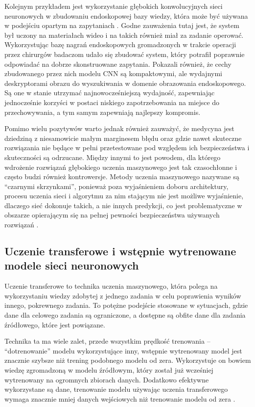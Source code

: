 Kolejnym przykładem jest wykorzystanie głębokich konwolucyjnych sieci neuronowych w zbudowaniu endoskopowej bazy wiedzy, która może być używana w podejściu opartym na zapytaniach \cite{petscharnig2018binary}.
Godne zauważenia tutaj jest, że system był uczony na materiałach wideo i na takich również miał za zadanie operować.
Wykorzystując bazę nagrań endoskopowych gromadzonych w trakcie operacji przez chirurgów badaczom udało się zbudować system, który potrafił poprawnie odpowiadać na dobrze skonstruowane zapytania.
Pokazali również, że cechy zbudowanego przez nich modelu CNN są kompaktowymi, ale wydajnymi deskryptorami obrazu do wyszukiwania w domenie obrazowania endoskopowego.
Są one w stanie utrzymać najnowocześniejszą wydajność, zapewniając jednocześnie korzyści w postaci niskiego zapotrzebowania na miejsce do przechowywania, a tym samym zapewniają najlepszy kompromis.

Pomimo wielu pozytywów warto jednak również zauważyć, że medycyna jest dziedziną z niesamowicie małym marginesem błędu oraz gdzie nawet skuteczne rozwiązania nie będące w pełni przetestowane pod względem ich bezpieczeństwa i skuteczności są odrzucane.
Między innymi to jest powodem, dla którego wdrożenie rozwiązań głębokiego uczenia maszynowego jest tak czasochłonne i często budzi również kontrowersje.
Metody uczenia maszynowego nazywane są ``czarnymi skrzynkami'', ponieważ poza wyjaśnieniem doboru architektury, procesu uczenia sieci i algorytmu za nim stającym nie jest możliwe wyjaśnienie, dlaczego sieć dokonuje takich, a nie innych predykcji, co jest problematyczne w obszarze opierającym się na pełnej pewności bezpieczeństwa używanych rozwiązań \cite{pouyanfar2018survey}.

\subsection{Uczenie transferowe i wstępnie wytrenowane modele sieci neuronowych}
\label{sec:transfer-learning}

Uczenie transferowe to technika uczenia maszynowego, która polega na wykorzystaniu wiedzy zdobytej z jednego zadania w celu poprawienia wyników innego, pokrewnego zadania.
To potężne podejście stosowane w sytuacjach, gdzie dane dla celowego zadania są ograniczone, a dostępne są obfite dane dla zadania źródłowego, które jest powiązane.

Technika ta ma wiele zalet, przede wszystkim prędkość trenowania -- ``dotrenowanie'' modelu wykorzystujące inny, wstępnie wytrenowany model jest znacznie szybsze niż trening podobnego modelu od zera.
Wykorzystuje on bowiem wiedzę zgromadzoną w modelu źródłowym, który został już wcześniej wytrenowany na ogromnych zbiorach danych.
Dodatkowo efektywne wykorzystane są dane, trenowanie modelu używając uczenia transferowego wymaga znacznie mniej danych wejściowych niż trenowanie modelu od zera \cite{weiss2016survey}.

